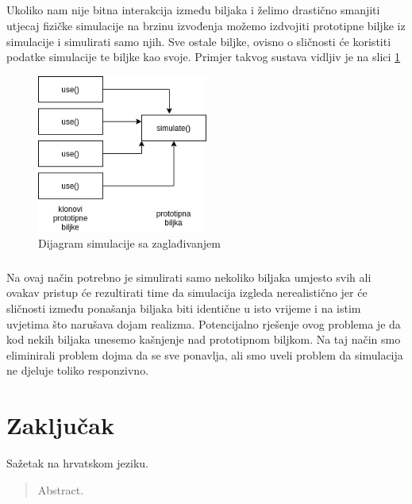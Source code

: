 \documentclass[times, utf8, diplomski]{fer}
\begin{document}
\paragraph{}
Ukoliko nam nije bitna interakcija između biljaka i želimo drastično smanjiti utjecaj 
fizičke simulacije na brzinu izvođenja možemo izdvojiti prototipne biljke iz simulacije i 
simulirati samo njih. Sve ostale biljke, ovisno o sličnosti će koristiti podatke simulacije 
te biljke kao svoje. Primjer takvog sustava vidljiv je na slici \ref{fig:531-3}
\begin{figure}[h]
	\centering
	\includegraphics[width=0.5\textwidth]{img/531-3}
	\caption{Dijagram simulacije sa zaglađivanjem}
	\label{fig:531-3}
\end{figure}
\paragraph{}
Na ovaj način potrebno je simulirati samo nekoliko biljaka umjesto svih ali ovakav pristup 
će rezultirati time da simulacija izgleda nerealistično jer će sličnosti između ponašanja 
biljaka biti identične u isto vrijeme i na istim uvjetima što narušava dojam realizma. 
Potencijalno rješenje ovog problema je da kod nekih biljaka unesemo kašnjenje nad 
prototipnom biljkom. Na taj način smo eliminirali problem dojma da se sve ponavlja, ali smo 
uveli problem da simulacija ne djeluje toliko responzivno.

\chapter{Zaključak}

\listoffigures

\lstlistoflistings
{}




\begin{sazetak}
Sažetak na hrvatskom jeziku.

\end{sazetak}

\begin{abstract}
Abstract.

\end{abstract}
\end{document}
